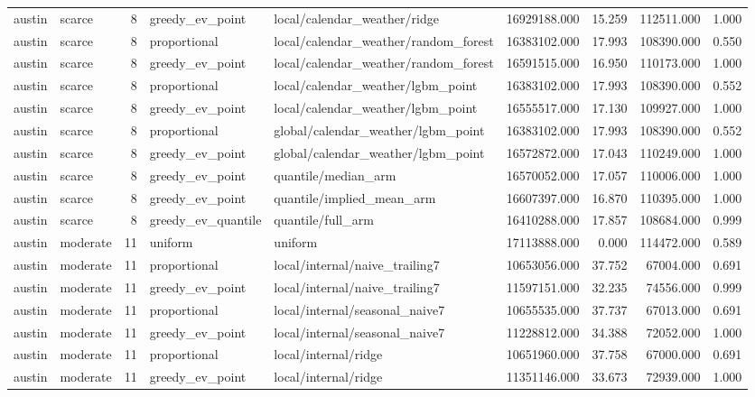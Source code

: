 \begin{tabular}{llrllrrrr}
austin & scarce & 8 & greedy\_ev\_point & local/calendar\_weather/ridge & 16929188.000 & 15.259 & 112511.000 & 1.000 \\
austin & scarce & 8 & proportional & local/calendar\_weather/random\_forest & 16383102.000 & 17.993 & 108390.000 & 0.550 \\
austin & scarce & 8 & greedy\_ev\_point & local/calendar\_weather/random\_forest & 16591515.000 & 16.950 & 110173.000 & 1.000 \\
austin & scarce & 8 & proportional & local/calendar\_weather/lgbm\_point & 16383102.000 & 17.993 & 108390.000 & 0.552 \\
austin & scarce & 8 & greedy\_ev\_point & local/calendar\_weather/lgbm\_point & 16555517.000 & 17.130 & 109927.000 & 1.000 \\
austin & scarce & 8 & proportional & global/calendar\_weather/lgbm\_point & 16383102.000 & 17.993 & 108390.000 & 0.552 \\
austin & scarce & 8 & greedy\_ev\_point & global/calendar\_weather/lgbm\_point & 16572872.000 & 17.043 & 110249.000 & 1.000 \\
austin & scarce & 8 & greedy\_ev\_point & quantile/median\_arm & 16570052.000 & 17.057 & 110006.000 & 1.000 \\
austin & scarce & 8 & greedy\_ev\_point & quantile/implied\_mean\_arm & 16607397.000 & 16.870 & 110395.000 & 1.000 \\
austin & scarce & 8 & greedy\_ev\_quantile & quantile/full\_arm & 16410288.000 & 17.857 & 108684.000 & 0.999 \\
austin & moderate & 11 & uniform & uniform & 17113888.000 & 0.000 & 114472.000 & 0.589 \\
austin & moderate & 11 & proportional & local/internal/naive\_trailing7 & 10653056.000 & 37.752 & 67004.000 & 0.691 \\
austin & moderate & 11 & greedy\_ev\_point & local/internal/naive\_trailing7 & 11597151.000 & 32.235 & 74556.000 & 0.999 \\
austin & moderate & 11 & proportional & local/internal/seasonal\_naive7 & 10655535.000 & 37.737 & 67013.000 & 0.691 \\
austin & moderate & 11 & greedy\_ev\_point & local/internal/seasonal\_naive7 & 11228812.000 & 34.388 & 72052.000 & 1.000 \\
austin & moderate & 11 & proportional & local/internal/ridge & 10651960.000 & 37.758 & 67000.000 & 0.691 \\
austin & moderate & 11 & greedy\_ev\_point & local/internal/ridge & 11351146.000 & 33.673 & 72939.000 & 1.000 \\

\end{tabular}
